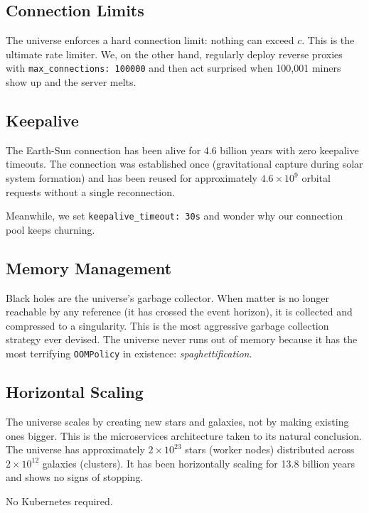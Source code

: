 \documentclass[12pt,a4paper]{article}
\begin{document}
\subsection{Connection Limits}

The universe enforces a hard connection limit: nothing can exceed $c$.
This is the ultimate rate limiter. We, on the other hand, regularly deploy
reverse proxies with \texttt{max\_connections: 100000} and then act surprised
when 100,001 miners show up and the server melts.

\subsection{Keepalive}

The Earth-Sun connection has been alive for 4.6 billion years with zero
keepalive timeouts. The connection was established once (gravitational
capture during solar system formation) and has been reused for approximately
$4.6 \times 10^9$ orbital requests without a single reconnection.

Meanwhile, we set \texttt{keepalive\_timeout: 30s} and wonder why our
connection pool keeps churning.

\subsection{Memory Management}

Black holes are the universe's garbage collector. When matter is no longer
reachable by any reference (it has crossed the event horizon), it is
collected and compressed to a singularity. This is the most aggressive
garbage collection strategy ever devised. The universe never runs out of
memory because it has the most terrifying \texttt{OOMPolicy} in existence:
\emph{spaghettification}.

\subsection{Horizontal Scaling}

The universe scales by creating new stars and galaxies, not by making
existing ones bigger. This is the microservices architecture taken to its
natural conclusion. The universe has approximately $2 \times 10^{23}$
stars (worker nodes) distributed across $2 \times 10^{12}$ galaxies
(clusters). It has been horizontally scaling for 13.8 billion years
and shows no signs of stopping.

No Kubernetes required.
\end{document}
